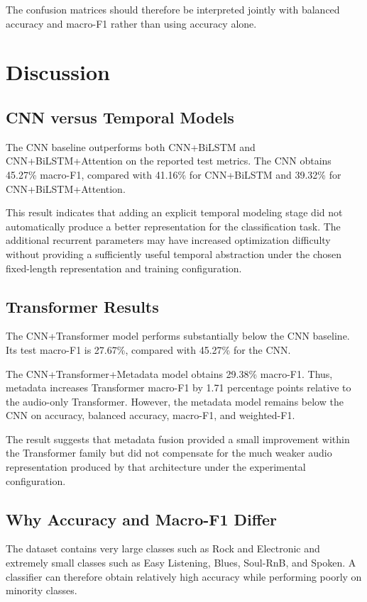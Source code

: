 \documentclass[11pt,a4paper]{article}
\begin{document}
The confusion matrices should therefore be interpreted jointly with balanced accuracy and macro-F1 rather than using accuracy alone.

\section{Discussion}

\subsection{CNN versus Temporal Models}

The CNN baseline outperforms both CNN+BiLSTM and CNN+BiLSTM+Attention on the reported test metrics. The CNN obtains 45.27\% macro-F1, compared with 41.16\% for CNN+BiLSTM and 39.32\% for CNN+BiLSTM+Attention.

This result indicates that adding an explicit temporal modeling stage did not automatically produce a better representation for the classification task. The additional recurrent parameters may have increased optimization difficulty without providing a sufficiently useful temporal abstraction under the chosen fixed-length representation and training configuration.

\subsection{Transformer Results}

The CNN+Transformer model performs substantially below the CNN baseline. Its test macro-F1 is 27.67\%, compared with 45.27\% for the CNN.

The CNN+Transformer+Metadata model obtains 29.38\% macro-F1. Thus, metadata increases Transformer macro-F1 by 1.71 percentage points relative to the audio-only Transformer. However, the metadata model remains below the CNN on accuracy, balanced accuracy, macro-F1, and weighted-F1.

The result suggests that metadata fusion provided a small improvement within the Transformer family but did not compensate for the much weaker audio representation produced by that architecture under the experimental configuration.

\subsection{Why Accuracy and Macro-F1 Differ}

The dataset contains very large classes such as Rock and Electronic and extremely small classes such as Easy Listening, Blues, Soul-RnB, and Spoken. A classifier can therefore obtain relatively high accuracy while performing poorly on minority classes.
\end{document}

